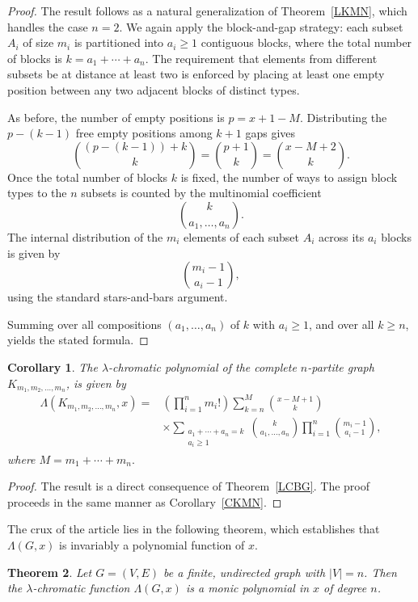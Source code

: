 \documentclass{birkjour}
\newtheorem{theorem}{Theorem}[section]
\newtheorem{Corollary}[theorem]{Corollary}
\theoremstyle{definition}
\theoremstyle{remark}
\numberwithin{equation}{section}
\begin{document}
\begin{proof}
The result follows as a natural generalization of Theorem~\ref{LKMN}, which handles the case \( n = 2 \). We again apply the block-and-gap strategy: each subset \( A_i \) of size \( m_i \) is partitioned into \( a_i \ge 1 \) contiguous blocks, where the total number of blocks is \( k = a_1 + \cdots + a_n \). The requirement that elements from different subsets be at distance at least two is enforced by placing at least one empty position between any two adjacent blocks of distinct types.

As before, the number of empty positions is \( p = x + 1 - M \). Distributing the
\( p - (k-1) \) free empty positions among \( k+1 \) gaps gives
\[
\binom{(p-(k-1))+k}{k} = \binom{p+1}{k} = \binom{x - M + 2}{k}.
\]
Once the total number of blocks \( k \) is fixed, the number of ways to assign block types to the \( n \) subsets is counted by the multinomial coefficient $$\binom{k}{a_1, \dots, a_n}.$$ 
The internal distribution of the \( m_i \) elements of each subset \( A_i \) across its \( a_i \) blocks is given by $$ \binom{m_i - 1}{a_i - 1},$$ using the standard stars-and-bars argument.

Summing over all compositions \( (a_1, \dots, a_n) \) of \( k \) with \( a_i \ge 1 \), and over all \( k \ge n \), yields the stated formula.
\end{proof}

\begin{Corollary}
The \( \lambda \)-chromatic polynomial of the complete \( n \)-partite graph 
\( K_{m_1,m_2,\dots,m_n} \), is given by
\begin{align*}
\Lambda(K_{m_1,m_2,\dots,m_n}, x)
= {} & \left( \prod_{i=1}^n m_i! \right)
\sum_{k = n}^{M} \binom{x - M + 1}{k} \\
& \times \sum_{\substack{a_1 + \cdots + a_n = k \\ a_i \ge 1}} 
\binom{k}{a_1, \dots, a_n}
\prod_{i = 1}^{n} \binom{m_i - 1}{a_i - 1},
\end{align*}
where \( M = m_1 + \cdots + m_n .\)
\end{Corollary}
\begin{proof}
The result is a direct consequence of Theorem~\ref{LCBG}. The proof proceeds in the same manner as Corollary~\ref{CKMN}. 
\end{proof}
The crux of the article lies in the following theorem, which establishes that $\Lambda(G,x)$ is invariably a polynomial function of $x$.
\begin{theorem}
\label{Poly}
Let \( G = (V, E) \) be a finite, undirected graph with \( |V| = n \). Then the \( \lambda \)-chromatic function \( \Lambda(G, x) \) is a monic polynomial in \( x \) of degree \( n \).
\end{theorem}
\end{document}
